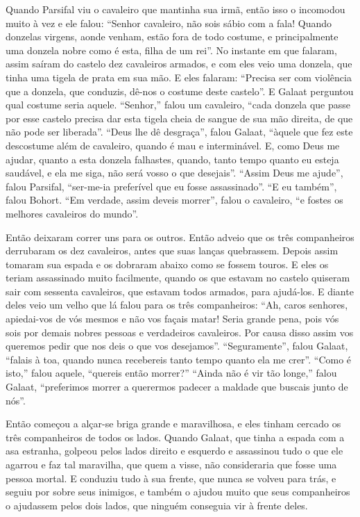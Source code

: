 Quando Parsifal viu o cavaleiro que mantinha sua irmã, então isso o incomodou
muito à vez e ele falou: “Senhor cavaleiro, não sois sábio com a fala! Quando
donzelas virgens, aonde venham, estão fora de todo costume, e principalmente
uma donzela nobre como é esta, filha de um rei”. No instante em que falaram,
assim saíram do castelo dez cavaleiros armados, e com eles veio uma donzela,
que tinha uma tigela de prata em sua mão. E eles falaram: “Precisa ser com
violência que a donzela, que conduzis, dê-nos o costume deste castelo”. E
Galaat perguntou qual costume seria aquele. “Senhor,” falou um cavaleiro, “cada
donzela que passe por esse castelo precisa dar esta tigela cheia de sangue de
sua mão direita, de que não pode ser liberada”. “Deus lhe dê desgraça”, falou
Galaat, “àquele que fez este descostume além de cavaleiro, quando é mau e
interminável. E, como Deus me ajudar, quanto a esta donzela falhastes, quando,
tanto tempo quanto eu esteja saudável, e ela me siga, não será vosso o que
desejais”. “Assim Deus me ajude”, falou Parsifal, “ser-me-ia preferível que eu
fosse assassinado”. “E eu também”, falou Bohort. “Em verdade, assim deveis
morrer”, falou o cavaleiro, “e fostes os melhores cavaleiros do mundo”.

 Então deixaram correr uns para os outros. Então adveio que os três companheiros
derrubaram os dez cavaleiros, antes que suas lanças quebrassem. Depois assim
tomaram sua espada e os dobraram abaixo como se fossem touros. E eles os teriam
assassinado muito facilmente, quando os que estavam no castelo quiseram sair
com sessenta cavaleiros, que estavam todos armados, para ajudá-los. E diante
deles veio um velho que lá falou para os três companheiros: “Ah, caros
senhores, apiedai-vos de vós mesmos e não vos façais matar! Seria grande pena,
pois vós sois por demais nobres pessoas e verdadeiros cavaleiros. Por causa
disso assim vos queremos pedir que nos deis o que vos desejamos”.
“Seguramente”, falou Galaat, “falais à toa, quando nunca recebereis tanto tempo
quanto ela me crer”. “Como é isto,” falou aquele, “quereis então morrer?”
“Ainda não é vir tão longe,” falou Galaat, “preferimos morrer a querermos
padecer a maldade que buscais junto de nós”. 

Então começou a alçar-se briga grande e maravilhosa, e eles tinham cercado os
três companheiros de todos os lados. Quando Galaat, que tinha a espada com a
asa estranha, golpeou pelos lados direito e esquerdo e assassinou tudo o que
ele agarrou e faz tal maravilha, que quem a visse, não consideraria que fosse
uma pessoa mortal. E conduziu tudo à sua frente, que nunca se volveu para trás,
e seguiu por sobre seus inimigos, e também o ajudou muito que seus companheiros
o ajudassem pelos dois lados, que ninguém conseguia vir à frente deles. 

